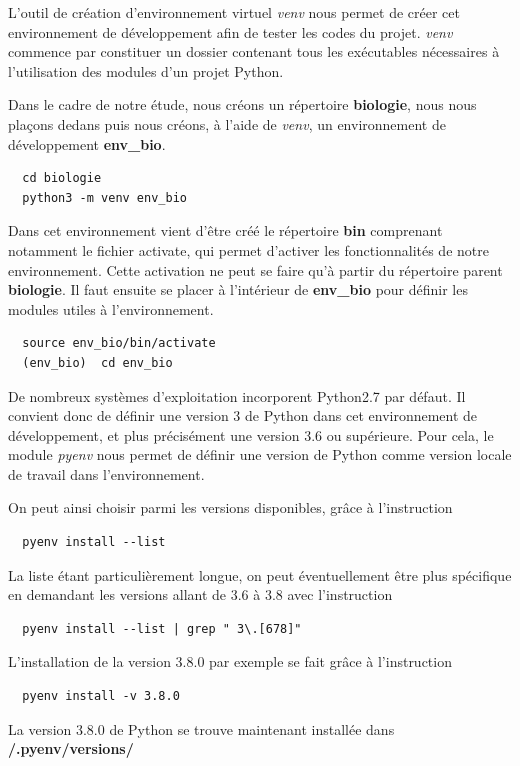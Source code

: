 \documentclass[twoside,a4paper,11pt,frenchb,openany]{report}
\begin{document}
L'outil de création d'environnement virtuel \textit{venv} nous permet de créer cet environnement de développement afin de tester les codes du projet. \textit{venv} commence par constituer un dossier contenant tous les exécutables nécessaires à l'utilisation des modules d'un projet Python. 

Dans le cadre de notre étude, nous créons un répertoire \textbf{biologie}, nous nous plaçons dedans puis nous créons, à l'aide de \textit{venv}, un environnement de développement \textbf{env\_bio}. 
\begin{verbatim}  cd biologie
  python3 -m venv env_bio\end{verbatim}

Dans cet environnement vient d'être créé le répertoire \textbf{bin} comprenant notamment le fichier activate, qui permet d'activer les fonctionnalités de notre environnement.
Cette activation ne peut se faire qu'à partir du répertoire parent \textbf{biologie}. Il faut ensuite se placer à l'intérieur de \textbf{env\_bio} pour définir les modules utiles à l'environnement. 
 \begin{verbatim}  source env_bio/bin/activate
  (env_bio)  cd env_bio\end{verbatim}

De nombreux systèmes d'exploitation incorporent Python2.7 par défaut. Il convient donc de définir une version 3 de Python dans cet environnement de développement, et plus précisément une version 3.6 ou supérieure. Pour cela, le module \textit{pyenv}  nous permet de définir une version de Python comme version locale de travail dans l'environnement. 

On peut ainsi choisir parmi les versions disponibles, grâce à l'instruction
\begin{verbatim}  pyenv install --list\end{verbatim}
La liste étant particulièrement longue, on peut éventuellement être plus spécifique en demandant les versions allant de 3.6 à 3.8 avec l'instruction
\begin{verbatim}  pyenv install --list | grep " 3\.[678]"\end{verbatim}

L'installation de la version 3.8.0 par exemple se fait grâce à l'instruction
\begin{verbatim}  pyenv install -v 3.8.0\end{verbatim}

La version 3.8.0 de Python se trouve maintenant installée dans \textbf{\raisebox{-1ex}{\textasciitilde}/.pyenv/versions/}
\end{document}
